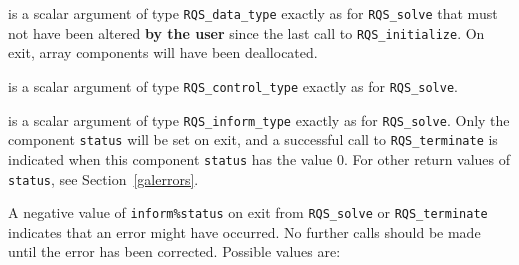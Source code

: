 \documentclass{galahad}
\newcommand{\packagename}{RQS}
\begin{document}
\begin{description}

 is a scalar \intentinout argument of type
{\tt \packagename\_data\_type}
exactly as for
{\tt \packagename\_solve}
that must not have been altered {\bf by the user} since the last call to
{\tt \packagename\_initialize}.
On exit, array components will have been deallocated.

 is a scalar \intentin argument of type
{\tt \packagename\_control\_type}
exactly as for
{\tt \packagename\_solve}.

 is a scalar \intentout argument of type
{\tt \packagename\_inform\_type}
exactly as for
{\tt \packagename\_solve}.
Only the component {\tt status} will be set on exit, and a
successful call to
{\tt \packagename\_terminate}
is indicated when this  component {\tt status} has the value 0.
For other return values of {\tt status}, see Section~\ref{galerrors}.

\end{description}


\galerrors
A negative value of  {\tt inform\%status} on exit from
{\tt \packagename\_solve}
or
{\tt \packagename\_terminate}
indicates that an error might have occurred. No further calls should be made
until the error has been corrected. Possible values are:
\end{document}
